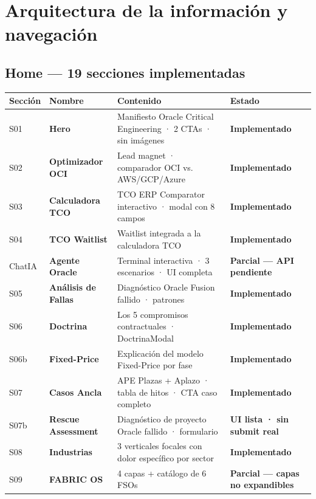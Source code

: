\documentclass[11pt, a4paper]{article}
\begin{document}
\newpage


\section{Arquitectura de la información y navegación}

\subsection{Home — 19 secciones implementadas}

\begin{longtable}{>{\ttfamily\color{accent}\small}l >{\bfseries}l X >{\small\bfseries}l}
\toprule
Sección & Nombre & Contenido & Estado \\
\midrule
\endhead
S01 & Hero & Manifiesto Oracle Critical Engineering · 2 CTAs · sin imágenes & \color{accent}Implementado \\
S02 & Optimizador OCI & Lead magnet · comparador OCI vs. AWS/GCP/Azure & \color{accent}Implementado \\
S03 & Calculadora TCO & TCO ERP Comparator interactivo · modal con 8 campos & \color{accent}Implementado \\
S04 & TCO Waitlist & Waitlist integrada a la calculadora TCO & \color{accent}Implementado \\
ChatIA & Agente Oracle & Terminal interactiva · 3 escenarios · UI completa & \color{accent2}Parcial — API pendiente \\
S05 & Análisis de Fallas & Diagnóstico Oracle Fusion fallido · patrones & \color{accent}Implementado \\
S06 & Doctrina & Los 5 compromisos contractuales · DoctrinaModal & \color{accent}Implementado \\
S06b & Fixed-Price & Explicación del modelo Fixed-Price por fase & \color{accent}Implementado \\
S07 & Casos Ancla & APE Plazas + Aplazo · tabla de hitos · CTA caso completo & \color{accent}Implementado \\
S07b & Rescue Assessment & Diagnóstico de proyecto Oracle fallido · formulario & \color{accent2}UI lista · sin submit real \\
S08 & Industrias & 3 verticales focales con dolor específico por sector & \color{accent}Implementado \\
S09 & FABRIC OS & 4 capas + catálogo de 6 FSOs & \color{accent2}Parcial — capas no expandibles \\

\end{longtable}
\end{document}
